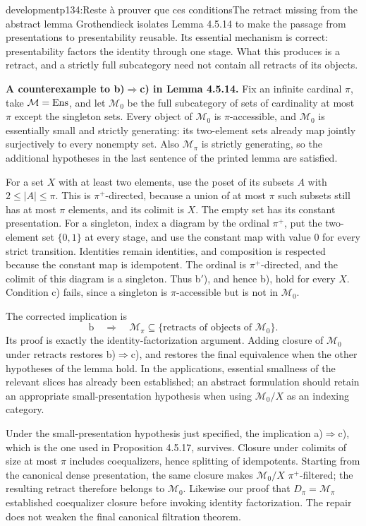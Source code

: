 \begin{dcomment}{development}{p134:Reste à prouver que ces conditions}{The retract missing from the abstract lemma}
Grothendieck isolates Lemma 4.5.14 to make the passage from presentations to presentability reusable. Its essential mechanism is correct: presentability factors the identity through one stage. What this produces is a retract, and a strictly full subcategory need not contain all retracts of its objects.

\textbf{A counterexample to b)$\Rightarrow$c) in Lemma 4.5.14.}\ours{}
Fix an infinite cardinal $\pi$, take $\mathcal M=\mathrm{Ens}$, and let $\mathcal M_0$ be the full subcategory of sets of cardinality at most $\pi$ except the singleton sets. Every object of $\mathcal M_0$ is $\pi$-accessible, and $\mathcal M_0$ is essentially small and strictly generating: its two-element sets already map jointly surjectively to every nonempty set. Also $\mathcal M_\pi$ is strictly generating, so the additional hypotheses in the last sentence of the printed lemma are satisfied.

For a set $X$ with at least two elements, use the poset of its subsets $A$ with $2\leq|A|\leq\pi$. This is $\pi^+$-directed, because a union of at most $\pi$ such subsets still has at most $\pi$ elements, and its colimit is $X$. The empty set has its constant presentation. For a singleton, index a diagram by the ordinal $\pi^+$, put the two-element set $\{0,1\}$ at every stage, and use the constant map with value $0$ for every strict transition. Identities remain identities, and composition is respected because the constant map is idempotent. The ordinal is $\pi^+$-directed, and the colimit of this diagram is a singleton. Thus b$'$), and hence b), hold for every $X$. Condition c) fails, since a singleton is $\pi$-accessible but is not in $\mathcal M_0$.

The corrected implication is
\[
 \mathrm{b}\quad\Longrightarrow\quad
 \mathcal M_\pi\subseteq
 \{\text{retracts of objects of }\mathcal M_0\}.
\]
Its proof is exactly the identity-factorization argument. Adding closure of $\mathcal M_0$ under retracts restores b)$\Rightarrow$c), and restores the final equivalence when the other hypotheses of the lemma hold. In the applications, essential smallness of the relevant slices has already been established; an abstract formulation should retain an appropriate small-presentation hypothesis when using $\mathcal M_0/X$ as an indexing category.

Under the small-presentation hypothesis just specified, the implication a)$\Rightarrow$c), which is the one used in Proposition 4.5.17, survives. Closure under colimits of size at most $\pi$ includes coequalizers, hence splitting of idempotents. Starting from the canonical dense presentation, the same closure makes $\mathcal M_0/X$ $\pi^+$-filtered; the resulting retract therefore belongs to $\mathcal M_0$. Likewise our proof that $D_\pi=\mathcal M_\pi$ established coequalizer closure before invoking identity factorization. The repair does not weaken the final canonical filtration theorem.
\end{dcomment}


